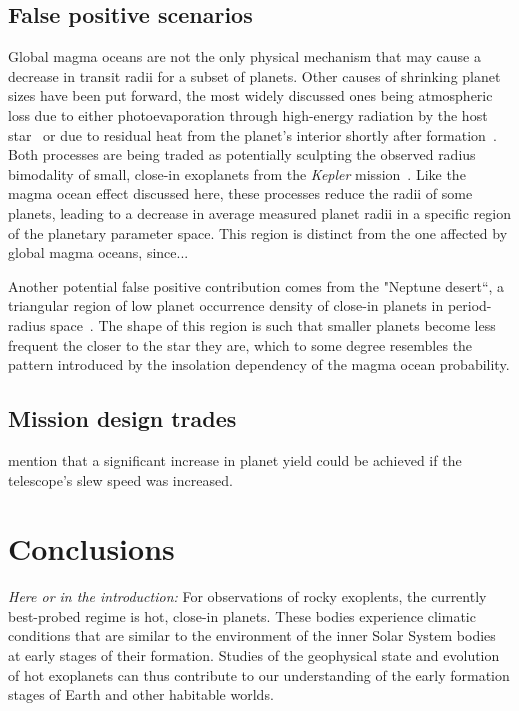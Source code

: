 \documentclass[modern]{aastex631}
\begin{document}
\subsection{False positive scenarios}
\begin{note}
Global magma oceans are not the only physical mechanism that may cause a decrease in transit radii for a subset of planets.
Other causes of shrinking planet sizes have been put forward, the most widely discussed ones being atmospheric loss due to either photoevaporation through high-energy radiation by the host star~\citep[e.g.,][]{Owen2013,Jin2014,Mordasini2020a} or due to residual heat from the planet's interior shortly after formation~\citep{Ginzburg2016b,Ginzburg2018,Gupta2019}.
    Both processes are being traded as potentially sculpting the observed radius bimodality of small, close-in exoplanets from the \textit{Kepler} mission~\citep{Fulton2017,VanEylen2018}.
    Like the magma ocean effect discussed here, these processes reduce the radii of some planets, leading to a decrease in average measured planet radii in a specific region of the planetary parameter space.
    This region is distinct from the one affected by global magma oceans, since... 

    Another potential false positive contribution comes from the "Neptune desert``, a triangular region of low planet occurrence density of close-in planets in period-radius space~\citep{Szabo2011,Mazeh2016,Dreizler2020b}.
    The shape of this region is such that smaller planets become less frequent the closer to the star they are, which to some degree resembles the pattern introduced by the insolation dependency of the magma ocean probability.
\end{note}

\subsection{Mission design trades}\label{sec:mission-design-trades}
\citet{Penny2019} mention that a significant increase in planet yield could be achieved if the telescope's slew speed was increased.

\section{Conclusions}

\begin{note}
    \textit{Here or in the introduction:} For observations of rocky exoplents, the currently best-probed regime is hot, close-in planets.
    These bodies experience climatic conditions that are similar to the environment of the inner Solar System bodies at early stages of their formation.
    Studies of the geophysical state and evolution of hot exoplanets can thus contribute to our understanding of the early formation stages of Earth and other habitable worlds.
\end{note}





\end{document}
